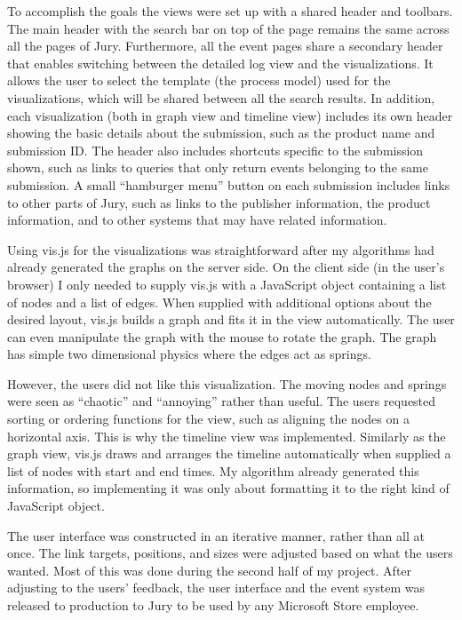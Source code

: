 To accomplish the goals the views were set up with a shared header and toolbars.
The main header with the search bar on top of the page remains the same across all the pages of Jury.
Furthermore, all the event pages share a secondary header that enables switching between the detailed log view and the visualizations. 
It allows the user to select the template (the process model) used for the visualizations, which will be shared between all the search results.
In addition, each visualization (both in graph view and timeline view) includes its own header showing the basic details about the submission, such as the product name and submission ID. The header also includes shortcuts specific to the submission shown, such as links to queries that only return events belonging to the same submission.
A small ``hamburger menu'' button on each submission includes links to other parts of Jury, such as links to the publisher information, the product information, and to other systems that may have related information.

Using vis.js for the visualizations was straightforward after my algorithms had already generated the graphs on the server side. 
On the client side (in the user's browser) I only needed to supply vis.js with a JavaScript object containing a list of nodes and a list of edges. When supplied with additional options about the desired layout, vis.js builds a graph and fits it in the view automatically. The user can even manipulate the graph with the mouse to rotate the graph. The graph has simple two dimensional physics where the edges act as springs.

However, the users did not like this visualization. The moving nodes and springs were seen as ``chaotic'' and ``annoying'' rather than useful. 
The users requested sorting or ordering functions for the view, such as aligning the nodes on a horizontal axis. 
This is why the timeline view was implemented. 
Similarly as the graph view, vis.js draws and arranges the timeline automatically when supplied a list of nodes with start and end times.
My algorithm already generated this information, so implementing it was only about formatting it to the right kind of JavaScript object.

The user interface was constructed in an iterative manner, rather than all at once. The link targets, positions, and sizes were adjusted based on what the users wanted. Most of this was done during the second half of my project.
After adjusting to the users' feedback, the user interface and the event system was released to production to Jury to be used by any Microsoft Store employee.

